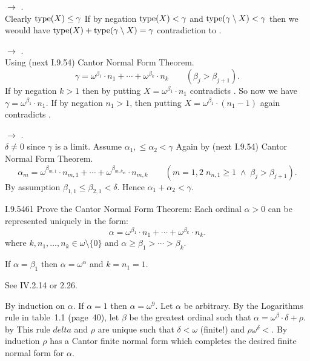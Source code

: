  \(\rightarrow\) .\\
Clearly \(\mathop{\mathrm{type}}(X) \leq \gamma\)
If by negation \(\mathop{\mathrm{type}}(X)<\gamma\)
and \(\mathop{\mathrm{type}}(\gamma\setminus X)<\gamma\)
then we weould have \(\mathop{\mathrm{type}}(X) + \mathop{\mathrm{type}}(\gamma\setminus X) = \gamma\)
contradiction to .

 \(\rightarrow\) .\\
Using (next I.9.54) Cantor Normal Form Theorem.
\begin{equation*}
\gamma = \omega^{\beta_1}\cdot n_1 + \cdots + \omega^{\beta_k}\cdot n_k
\qquad (\beta_j > \beta_{j+1}).
\end{equation*}
If by negation \(k > 1\) then by putting \(X =  \omega^{\beta_1}\cdot n_1\)
contradicts . So now we have \(\gamma = \omega^{\beta_1}\cdot n_1\).
If by negation \(n_1 > 1\), then putting \(X =  \omega^{\beta_1}\cdot (n_1 - 1)\)
again contradicts .

 \(\rightarrow\) .\\
\(\delta \neq 0\) since \(\gamma\) is a limit.
Assume \(\alpha_1, \leq \alpha_2 < \gamma\)
Again by (next I.9.54) Cantor Normal Form Theorem.
\begin{equation*}
\alpha_m = \omega^{\beta_{m,1}}\cdot n_{m,1} + \cdots + \omega^{\beta_{m,k_m}}\cdot n_{m,k}
\qquad (m=1,2\;n_{n,1}\geq 1\;\land\;\beta_j > \beta_{j+1}).
\end{equation*}
By assumption \(\beta_{1,1} \leq \beta_{2,1} < \delta\).
Hence \(\alpha_1 + \alpha_2 < \gamma\).

\begin{lexcopy}{I.9.54}{61}
Prove the Cantor Normal Form Theorem: Each ordinal
\(\alpha > 0\) can be represented uniquely in the form:
\begin{equation*}
\alpha =\omega^{\beta_1}\cdot n_1 + \cdots + \omega^{\beta_k}\cdot n_k .
\end{equation*}
where \(k,n_1,\ldots,n_k \in \omega \setminus \{0\}\)
and
\(\alpha \geq \beta_1 > \cdots > \beta_k\).

If \(\alpha = \beta_1\) then \(\alpha = \omega^\alpha\) and \(k = n_1 = 1\).
\end{lexcopy}

See \cite{Levy2002Basic} IV.2.14 or \cite{Jech2006Set} 2.26.

By induction on \(\alpha\).
If \(\alpha=1\) then \(\alpha = \omega^9\).
Let \(\alpha\) be arbitrary.
By the Logarithms rule in table~1.1 (page~40),
let \(\beta\)
be the greatest ordinal such that \(\alpha = \omega^\beta\cdot\delta + \rho\).
by This rule \(delta\) and \(\rho\) are unique
such that \(\delta< \omega\) (finite!) and \(\rho \omega^\delta<\).
By induction \(\rho\) has a Cantor finite normal form
which completes the desired finite normal form for \(\alpha\).

